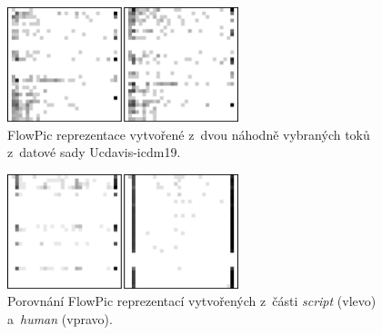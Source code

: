 \begin{table}[H]
    \centering
    \caption{Analýza datové sady Ucdavis-icdm19.}
    \label{ucdavis_analysis}
\end{table}

\begin{figure}[H]
	\centering
	\includegraphics[width=0.6\textwidth]{obrazky-figures/ucd_flowpics.png}
	\caption{FlowPic reprezentace vytvořené z~dvou náhodně vybraných toků z~datové sady Ucdavis-icdm19.}
	\label{ucd_flowpics}
\end{figure}

\begin{figure}[H]
	\centering
	\includegraphics[width=0.6\textwidth]{obrazky-figures/script_human_flowpics.png}
	\caption{Porovnání FlowPic reprezentací vytvořených z~části \textit{script} (vlevo) a~\textit{human} (vpravo).}
	\label{ucd_h_s_flowpics}
\end{figure}


